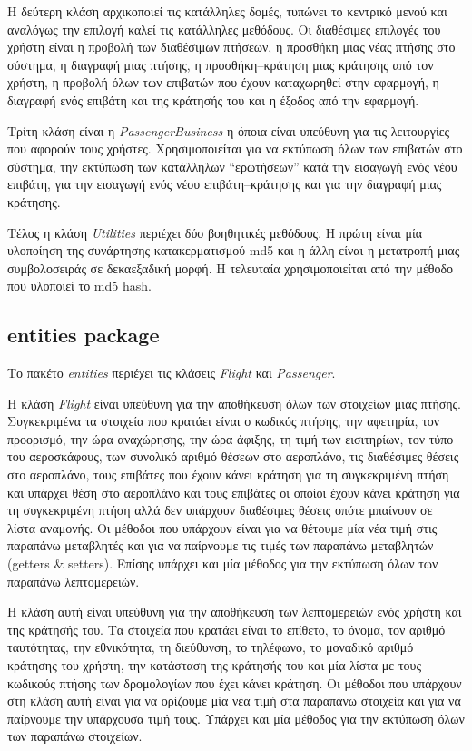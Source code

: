\documentclass[a4paper]{article}
\begin{document}
Η δεύτερη κλάση αρχικοποιεί τις κατάλληλες δομές, τυπώνει το κεντρικό μενού και
αναλόγως την επιλογή καλεί τις κατάλληλες μεθόδους. Οι διαθέσιμες επιλογές του
χρήστη είναι η προβολή των διαθέσιμων πτήσεων, η προσθήκη μιας νέας πτήσης στο
σύστημα, η διαγραφή μιας πτήσης, η προσθήκη--κράτηση μιας κράτησης από τον
χρήστη, η προβολή όλων των επιβατών που έχουν καταχωρηθεί στην εφαρμογή, η
διαγραφή ενός επιβάτη και της κράτησής του και η έξοδος από την εφαρμογή.

Τρίτη κλάση είναι η \emph{PassengerBusiness} η όποια είναι υπεύθυνη για τις
λειτουργίες που αφορούν τους χρήστες. Χρησιμοποιείται για να εκτύπωση όλων των
επιβατών στο σύστημα, την εκτύπωση των κατάλληλων ``ερωτήσεων'' κατά την
εισαγωγή ενός νέου επιβάτη, για την εισαγωγή ενός νέου επιβάτη--κράτησης και για
την διαγραφή μιας κράτησης.

Τέλος η κλάση \emph{Utilities} περιέχει δύο βοηθητικές μεθόδους. Η πρώτη είναι
μία υλοποίηση της συνάρτησης κατακερματισμού md5 και η άλλη είναι η μετατροπή
μιας συμβολοσειράς σε δεκαεξαδική μορφή. Η τελευταία χρησιμοποιείται από την
μέθοδο που υλοποιεί το md5 hash.

\subsection{entities package}
Το πακέτο \emph{entities} περιέχει τις κλάσεις \emph{Flight} και
\emph{Passenger}.

Η κλάση \emph{Flight} είναι υπεύθυνη για την αποθήκευση όλων των στοιχείων
μιας πτήσης. Συγκεκριμένα τα στοιχεία που κρατάει είναι ο κωδικός πτήσης, την
αφετηρία, τον προορισμό, την ώρα αναχώρησης, την ώρα άφιξης, τη τιμή των
εισιτηρίων, τον τύπο του αεροσκάφους, των συνολικό αριθμό θέσεων στο αεροπλάνο,
τις διαθέσιμες θέσεις στο αεροπλάνο, τους επιβάτες που έχουν κάνει κράτηση για
τη συγκεκριμένη πτήση και υπάρχει θέση στο αεροπλάνο και τους επιβάτες οι οποίοι
έχουν κάνει κράτηση για τη συγκεκριμένη πτήση αλλά δεν υπάρχουν διαθέσιμες
θέσεις οπότε μπαίνουν σε λίστα αναμονής. Οι μέθοδοι που υπάρχουν είναι για να
θέτουμε μία νέα τιμή στις παραπάνω μεταβλητές και για να παίρνουμε τις τιμές των
παραπάνω μεταβλητών (getters \& setters). Επίσης υπάρχει και μία μέθοδος για την
εκτύπωση όλων των παραπάνω λεπτομερειών.

Η κλάση αυτή είναι υπεύθυνη για την αποθήκευση των λεπτομερειών ενός χρήστη
και της κράτησής του. Τα στοιχεία που κρατάει είναι το επίθετο, το όνομα, τον
αριθμό ταυτότητας, την εθνικότητα, τη διεύθυνση, το τηλέφωνο, το μοναδικό αριθμό
κράτησης του χρήστη, την κατάσταση της κράτησής του και μία λίστα με τους
κωδικούς πτήσης των δρομολογίων που έχει κάνει κράτηση. Οι μέθοδοι που υπάρχουν
στη κλάση αυτή είναι για να ορίζουμε μία νέα τιμή στα παραπάνω στοιχεία και για
να παίρνουμε την υπάρχουσα τιμή τους. Υπάρχει και μία μέθοδος για την εκτύπωση
όλων των παραπάνω στοιχείων.
\end{document}
